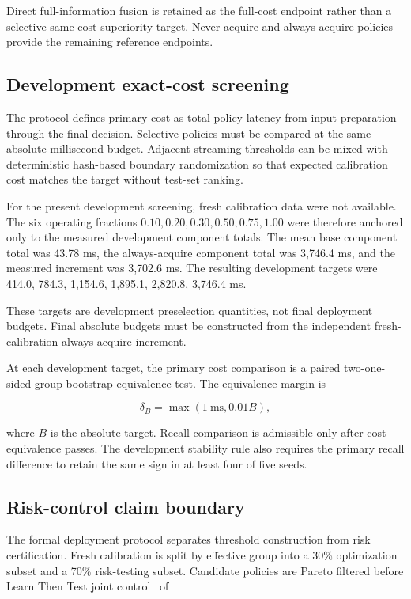 \documentclass[11pt]{article}
\newcommand{\BaseComponentCost}{43.78}
\newcommand{\AlwaysComponentCost}{3,746.4}
\newcommand{\DevelopmentIncrement}{3,702.6}
\newcommand{\DevelopmentBudgetTargets}{414.0, 784.3, 1,154.6, 1,895.1, 2,820.8, 3,746.4}
\begin{document}
Direct full-information fusion is retained as the full-cost
endpoint rather than a selective same-cost superiority target.
Never-acquire and always-acquire policies provide the remaining
reference endpoints.

\subsection{Development exact-cost screening}

The protocol defines primary cost as total policy latency from input
preparation through the final decision. Selective policies must be
compared at the same absolute millisecond budget. Adjacent streaming
thresholds can be mixed with deterministic hash-based boundary
randomization so that expected calibration cost matches the target
without test-set ranking.

For the present development screening, fresh calibration data were
not available. The six operating fractions
\(0.10,0.20,0.30,0.50,0.75,1.00\) were therefore anchored only to
the measured development component totals. The mean base component
total was \BaseComponentCost{} ms, the always-acquire component
total was \AlwaysComponentCost{} ms, and the measured increment was
\DevelopmentIncrement{} ms. The resulting development targets were
\DevelopmentBudgetTargets{} ms.

These targets are development preselection quantities, not final
deployment budgets. Final absolute budgets must be constructed from
the independent fresh-calibration always-acquire increment.

At each development target, the primary cost comparison is a paired
two-one-sided group-bootstrap equivalence test. The equivalence
margin is

\[
\delta_B
=
\max
\left(
1\ \mathrm{ms},
0.01 B
\right),
\]

where \(B\) is the absolute target. Recall comparison is admissible
only after cost equivalence passes. The development stability rule
also requires the primary recall difference to retain the same sign
in at least four of five seeds.

\subsection{Risk-control claim boundary}

The formal deployment protocol separates threshold construction
from risk certification. Fresh calibration is split by effective
group into a 30\% optimization subset and a 70\% risk-testing
subset. Candidate policies are Pareto filtered before Learn Then
Test joint control~\cite{angelopoulos2025} of
\end{document}
